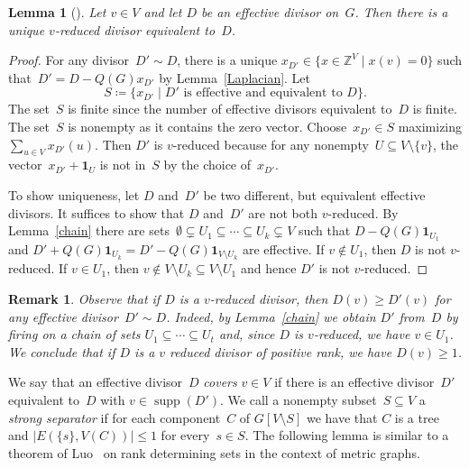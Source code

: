 \documentclass[10pt]{amsart}
\newtheorem{lemma}[theorem]{Lemma}
\newtheorem{rema}[theorem]{Remark}
\newcommand{\Z}{\ensuremath{\mathbb{Z}}}
\newcommand{\one}{\ensuremath{\mathbf{1}}}
\DeclareMathOperator{\supp}{supp}
\begin{document}
\begin{lemma}[{\cite[Proposition~3.1]{BakerNorine2007}}]\label{reduction}
Let $v\in V$ and let $D$ be an effective divisor on~$G$. Then there is a unique $v$-reduced divisor equivalent to~$D$.
\end{lemma}

\begin{proof}
For any divisor~$D' \sim D$, there is a unique $x_{D'}\in \{x\in \Z^V\mid x(v)=0\}$ such that~$D'=D-Q(G)x_{D'}$ by Lemma~\ref{Laplacian}. Let 
\begin{equation}
S\coloneqq \{x_{D'}\mid D'\text{ is effective and equivalent to~$D$}\}.
\end{equation}
The set~$S$ is finite since the number of effective divisors equivalent to~$D$ is finite. The set~$S$ is nonempty as it contains the zero vector. Choose~$x_{D'}\in S$ maximizing $\sum_{u\in V} x_{D'}(u)$. Then $D'$ is $v$-reduced because for any nonempty~$U\subseteq V\setminus \{v\}$, the vector~$x_{D'}+\one_U$ is not in~$S$ by the choice of~$x_{D'}$. 

To show uniqueness, let $D$ and~$D'$ be two different, but equivalent effective divisors. It suffices to show that $D$ and~$D'$ are not both $v$-reduced. By Lemma~\ref{chain} there are sets~$\emptyset\subsetneq U_1\subseteq\cdots\subseteq U_k\subsetneq V$ such that $D-Q(G)\one_{U_1}$ and $D'+Q(G)\one_{U_k}=D'-Q(G)\one_{V\setminus U_k}$ are effective. If $v\not\in U_1$, then $D$ is not $v$-reduced. If $v\in U_1$, then $v\not\in V\setminus U_k\subseteq V\setminus U_1$ and hence $D'$ is not $v$-reduced.
\end{proof}
\begin{rema}
Observe that if $D$ is a $v$-reduced divisor, then $D(v)\geq D'(v)$ for any effective divisor~$D'\sim D$. Indeed, by Lemma~\ref{chain} we obtain $D'$ from~$D$ by firing on a chain of sets $U_1\subseteq\cdots\subseteq U_t$ and, since $D$ is $v$-reduced, we have $v\in U_1$. We conclude that if $D$ is a $v$ reduced divisor of positive rank, we have $D(v)\geq 1$. 
\end{rema}

We say that an effective divisor~$D$ \emph{covers} $v\in V$ if there is an effective divisor~$D'$ equivalent to~$D$ with $v\in \supp(D')$. We call a nonempty subset~$S\subseteq V$ a \emph{strong separator} if for each component~$C$ of $G[V\setminus S]$ we have that $C$ is a tree and $|E(\{s\},V(C))|\leq 1$ for every~$s\in S$. The following lemma is similar to a theorem of Luo~\cite{Luo2011} on rank determining sets in the context of metric graphs.
\end{document}
